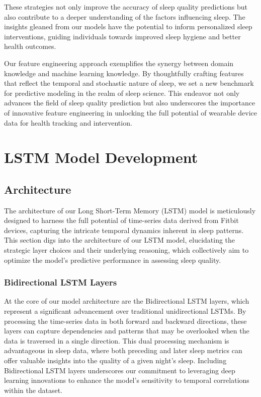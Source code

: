 \documentclass[10pt]{extarticle}
\begin{document}
These strategies not only improve the accuracy of sleep quality predictions but also contribute to a deeper understanding of the factors influencing sleep. The insights gleaned from our models have the potential to inform personalized sleep interventions, guiding individuals towards improved sleep hygiene and better health outcomes.

Our feature engineering approach exemplifies the synergy between domain knowledge and machine learning knowledge. By thoughtfully crafting features that reflect the temporal and stochastic nature of sleep, we set a new benchmark for predictive modeling in the realm of sleep science. This endeavor not only advances the field of sleep quality prediction but also underscores the importance of innovative feature engineering in unlocking the full potential of wearable device data for health tracking and intervention.

\section{LSTM Model Development}

\subsection{Architecture}

The architecture of our Long Short-Term Memory (LSTM) model is meticulously designed to harness the full potential of time-series data derived from Fitbit devices, capturing the intricate temporal dynamics inherent in sleep patterns. This section digs into the architecture of our LSTM model, elucidating the strategic layer choices and their underlying reasoning, which collectively aim to optimize the model's predictive performance in assessing sleep quality.

\subsubsection{Bidirectional LSTM Layers}

At the core of our model architecture are the Bidirectional LSTM layers, which represent a significant advancement over traditional unidirectional LSTMs. By processing the time-series data in both forward and backward directions, these layers can capture dependencies and patterns that may be overlooked when the data is traversed in a single direction. This dual processing mechanism is advantageous in sleep data, where both preceding and later sleep metrics can offer valuable insights into the quality of a given night's sleep. Including Bidirectional LSTM layers underscores our commitment to leveraging deep learning innovations to enhance the model's sensitivity to temporal correlations within the dataset.
\end{document}
